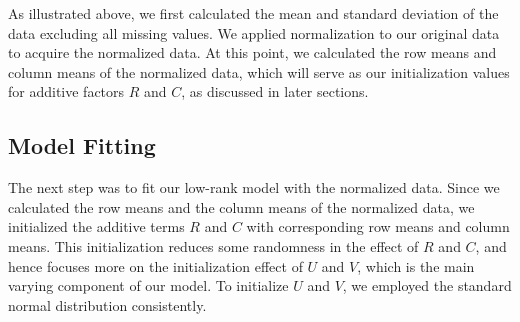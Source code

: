 \documentclass{article}
\begin{document}
As illustrated above, we first calculated the mean and standard deviation of the data excluding all missing values. We applied normalization to our original data to acquire the normalized data. At this point, we calculated the row means and column means of the normalized data, which will serve as our initialization values for additive factors $R$ and $C$, as discussed in later sections. 
\subsection{Model Fitting}
The next step was to fit our low-rank model with the normalized data. Since we calculated the row means and the column means of the normalized data, we initialized the additive terms $R$ and $C$ with corresponding row means and column means. This initialization reduces some randomness in the effect of $R$ and $C$, and hence focuses more on the initialization effect of $U$ and $V$, which is the main varying component of our model. To initialize $U$ and $V$, we employed the standard normal distribution consistently. 
\end{document}
